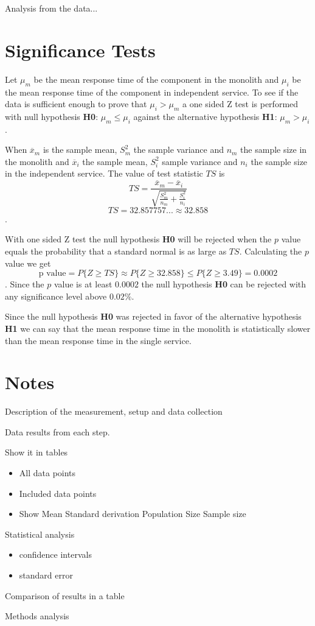 Analysis from the data...

\section{Significance Tests}
Let $\mu_m$ be the mean response time of the component in the monolith and $\mu_i$ be the mean response time of the component in independent service.
To see if the data is sufficient enough to prove that $\mu_i > \mu_m$ a one sided Z test is performed with null hypothesis \textbf{H0}: $\mu_m \leq \mu_i$ against the alternative hypothesis \textbf{H1}: $\mu_m > \mu_i$.

When $\overline{x}_m$ is the sample mean, $S_m^2$ the sample variance and $n_m$ the sample size in the monolith 
and $\overline{x}_i$ the sample mean, $S_i^2$ sample variance and $n_i$ the sample size in the independent service.
The value of test statistic $TS$ is
\[
TS=\frac{\overline{x}_m-\overline{x}_i}{\sqrt{\frac{S_m^2}{n_m}+\frac{S_i^2}{n_i}}}
\]
\[
TS=32.857757... \approx 32.858
 \].
 
With one sided Z test the null hypothesis \textbf{H0} will be rejected when the $p$ value 
equals the probability that a standard normal is as large as $TS$. Calculating the $p$ value we get
\[
\text{p value} = P\{Z\geq TS\} \approx P\{Z\geq 32.858\} \leq P\{Z\geq 3.49\} = 0.0002
\].
Since the $p$ value is at least $0.0002$ the null hypothesis \textbf{H0} can be rejected with any significance level above $0.02\%$. %

Since the null hypothesis \textbf{H0} was rejected in favor of the alternative hypothesis \textbf{H1} we can say that the mean response time in the monolith is statistically slower than the mean response time in the single service.

\section{Notes}
Description of the measurement, setup and data collection

Data results from each step.

Show it in tables
\begin{itemize}
    \item All data points
    \item Included data points
    \item Show
    \subitem Mean
    \subitem Standard derivation
    \subitem Population Size
    \subitem Sample size
\end{itemize}

Statistical analysis
\begin{itemize}
    \item confidence intervals
    \item standard error
\end{itemize}

Comparison of results in a table

Methods analysis